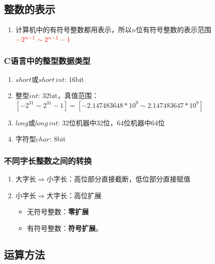 \documentclass[./computer-organization-and-architecture.tex]{subfiles}
\begin{document}
    \subsection{整数的表示}

    \begin{enumerate}
        \item 计算机中的有符号整数都用{\color{red}{补码}}表示，所以$n$位有符号整数的表示范围${\color{red}{-2^{n-1} \sim 2^{n-1} - 1}}$
    \end{enumerate}

    \subsubsection{C语言中的整型数据类型}

    \begin{enumerate}
        \item $short$或$short \, int$: 16bit
        \item 整型$int$: 32bit，真值范围：$[-2^{31} \sim 2^{31}-1] = [-2.147483648*10^{9} \sim 2.147483647 * 10^{9}]$
        \item $long$或$long \,int$: 32位机器中32位，64位机器中64位
        \item 字符型$char$: 8bit
    \end{enumerate}

    \subsubsection{不同字长整数之间的转换}

    \begin{enumerate}
        \item 大字长$\Rightarrow$小字长：高位部分直接截断，低位部分直接赋值
        \item 小字长$\Rightarrow$大字长：高位扩展
        \begin{itemize}
            \item 无符号整数：\textbf{零扩展}
            \item 有符号整数：\textbf{符号扩展}。{\color{red}{符号扩展前后真值保持不变}}
        \end{itemize}
    \end{enumerate}

    \subsection{运算方法}
\end{document}
